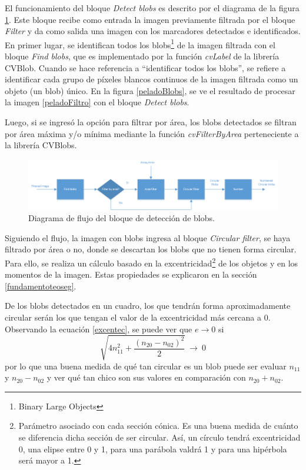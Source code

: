El funcionamiento del bloque \emph{Detect blobs} es descrito por el diagrama de la figura \ref{diagramadetectblobs}. Este bloque recibe como entrada la imagen previamente filtrada por el bloque \emph{Filter} y da como salida una imagen con los marcadores detectados e identificados. En primer lugar, se identifican todos los blobs\footnote{Binary Large Objects\cite{defBlob}} de la imagen filtrada con el bloque \emph{Find blobs}, que es implementado por la función \emph{cvLabel} de la librería CVBlob\cite{cvblob}. Cuando se hace referencia a ``identificar todos los blobs'', se refiere a identificar cada grupo de píxeles blancos continuos de la imagen filtrada como un objeto (un blob) único. En la figura \ref{peladoBlobs}, se ve el resultado de procesar la imagen \ref{peladoFiltro} con el bloque \emph{Detect blobs}. 

Luego, si se ingresó la opción para filtrar por área, los blobs\cite{defBlob} detectados se filtran por área máxima y/o mínima mediante la función \emph{cvFilterByArea} perteneciente a la librería CVBlobs\cite{cvblob}. 

\begin{figure}[H]
\begin{center}
\includegraphics[scale=0.7]{img/detectBlobs_diagrama.png}
\end{center}
\caption{Diagrama de flujo del bloque de detección de blobs.}
\label{diagramadetectblobs}
\end{figure}

Siguiendo el flujo, la imagen con blobs ingresa al bloque \emph{Circular filter}, se haya filtrado por área o no, donde se descartan los blobs que no tienen forma circular. Para ello, se realiza un cálculo basado en la excentricidad\footnote{Parámetro asociado con cada sección cónica. Es una buena medida de cuánto se diferencia dicha sección de ser circular. Así, un círculo tendrá excentricidad 0, una elipse entre 0 y 1, para una parábola valdrá 1 y para una hipérbola será mayor a 1\cite{excentricidad}. } de los objetos y en los momentos de la imagen. Estas propiedades se explicaron en la sección \ref{fundamentoteoseg}.

De los blobs detectados en un cuadro, los que tendrán forma aproximadamente circular serán los que tengan el valor de la excentricidad más cercana a $0$. Observando la ecuación \ref{excentec}, se puede ver que $e{\rightarrow}0$ si $$\sqrt{4n_{11}^2+\frac{(n_{20}-n_{02})^2}{2}}\ {\rightarrow}\ 0$$ por lo que una buena medida de qué tan circular es un blob puede ser evaluar $n_{11}$ y $n_{20}-n_{02}$ y ver qué tan chico son sus valores en comparación con $n_{20}+n_{02}$.


